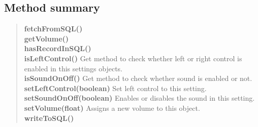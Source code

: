 \documentclass[11pt,a4paper]{report}
\begin{document}
{{{{{\subsection{Method summary}{
\begin{verse}
{\bf fetchFromSQL()} \\
{\bf getVolume()} \\
{\bf hasRecordInSQL()} \\
{\bf isLeftControl()} Get method to check whether left or right control is enabled in this settings objects.\\
{\bf isSoundOnOff()} Get method to check whether sound is enabled or not.\\
{\bf setLeftControl(boolean)} Set left control to this setting.\\
{\bf setSoundOnOff(boolean)} Enables or disables the sound in this setting.\\
{\bf setVolume(float)} Assigns a new volume to this object.\\
{\bf writeToSQL()} \\
\end{verse}
}
}}}}}
\end{document}

